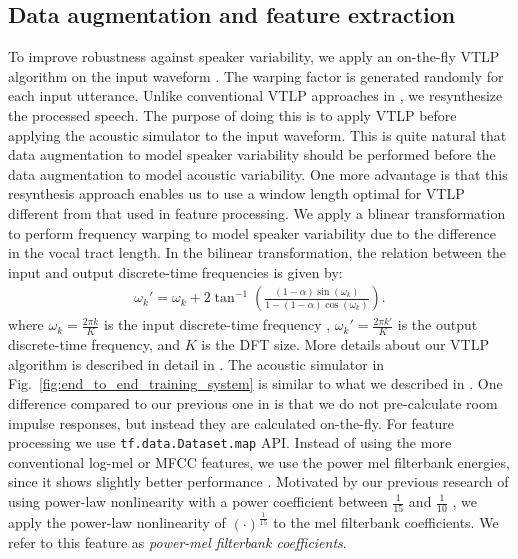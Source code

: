 \documentclass{article}
\begin{document}
\subsection{Data augmentation and feature extraction}
\label{sec:feature_extraction}
To improve robustness against speaker variability, we apply an
on-the-fly VTLP algorithm on the input waveform
\cite{c_kim_interspeech_2019_00}. The warping
factor is generated randomly for each input utterance. Unlike
conventional VTLP approaches in \cite{n_jaitly_icml_workshop_2013_00,   
x_cui_taslp_2015_00}, we resynthesize the processed
speech. The purpose of doing this is to apply VTLP before applying
the acoustic simulator to the input waveform.  This is quite 
natural that data augmentation to model speaker variability 
should be performed before the data augmentation to model
acoustic variability.
One more advantage is that this
resynthesis approach enables us to use a window length 
optimal for VTLP different from that used in feature processing.
We apply a blinear transformation \cite{p_zhan_cmu_tech_report_1997_00} 
to perform frequency warping
to model speaker variability due to the difference in the vocal tract length.
In the bilinear transformation, the relation between the input
and output discrete-time frequencies is given by: 
\begin{align}
  \omega_k'  = \omega_k + 2 \tan^{-1} \left(
                    \frac{ \left(1 - \alpha \right) \sin(\omega_k)} 
              {1 - (1 - \alpha) \cos(\omega_k) } \right)
                            \label{eq:bilinear_transformation}.
\end{align}
where $\omega_k = \frac{2 \pi k}{K}$ is the input discrete-time frequency
, $\omega_k' = \frac{2 \pi k'}{K}$ is the output discrete-time frequency, and
  $K$ is the DFT size. 
More details about our VTLP algorithm is described 
in detail in \cite{c_kim_interspeech_2019_00}.
The acoustic simulator in Fig.~\ref{fig:end_to_end_training_system}
is similar to what we described in 
\cite{c_kim_interspeech_2017_00, c_kim_interspeech_2018_00}.
One difference compared to our previous one in 
\cite{c_kim_interspeech_2017_00} is that we do not pre-calculate
room impulse responses, but instead they are calculated on-the-fly.
For feature processing we use {\tt tf.data.Dataset.map} API. 
Instead of using the more conventional log-mel or 
MFCC features, we use the power mel filterbank energies,
since it shows slightly better performance \cite{c_kim_interspeech_2019_00,
c_kim_asru_2019_00}. Motivated by our previous research of
using power-law nonlinearity with a power coefficient between 
$\frac{1}{15}$ \cite{C_Kim_ICASSP_2010_1, C_Kim_ICASSP_2012_1, C_Kim_PhDThesis_2010} and 
$\frac{1}{10}$ \cite{C_Kim_INTERSPEECH_2009_2}, we apply the 
power-law nonlinearity of $(\cdot)^{\frac{1}{15}}$ to the mel filterbank 
coefficients. We refer to this feature as {\it power-mel filterbank
coefficients}.
\end{document}
